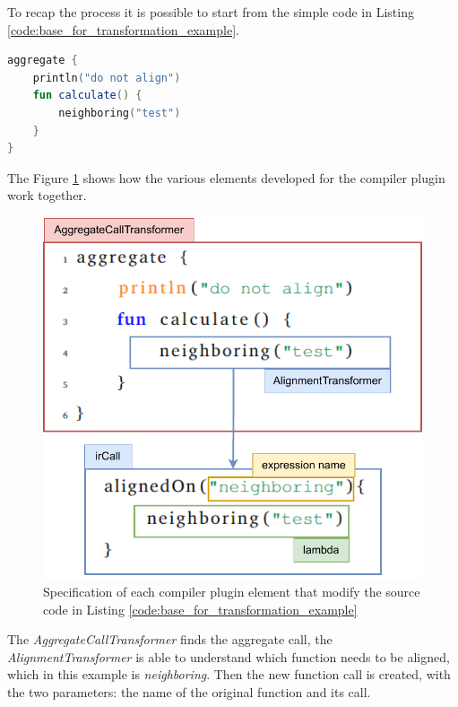 To recap the process it is possible to start from the simple code in Listing \ref{code:base_for_transformation_example}.
\begin{lstlisting}[caption={Base example of aggregate program}, captionpos=b, language=Kotlin, label={code:base_for_transformation_example}]
aggregate {
    println("do not align")
    fun calculate() {
        neighboring("test")
    }
}
\end{lstlisting}
The Figure \ref{fig:ir_trasformation_with_code_elements} shows how the various elements developed for the compiler plugin work together.
\begin{figure}[!ht]
    \centering
    \includegraphics[scale=0.9]{document/chapters/3-alignment/images/ir_trasformation_with_code_elements.pdf}
    \caption{Specification of each compiler plugin element that modify the source code in Listing \ref{code:base_for_transformation_example}}
    \label{fig:ir_trasformation_with_code_elements}
\end{figure}
The \textit{AggregateCallTransformer} finds the aggregate call, the \textit{AlignmentTransformer} is able to understand which function needs to be aligned, which in this example is \textit{neighboring}. Then the new function call is created, with the two parameters: the name of the original function and its call.

